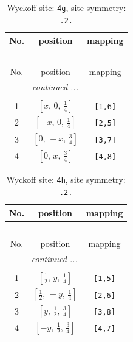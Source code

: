 \documentclass[fleqn,8pt]{jsarticle}
\begin{document}
\begin{longtable}{ccc}
\caption{Wyckoff site: {\tt 4g}, site symmetry: {\tt .2.}}
 \\
 \hline \hline
No. & position & mapping \\ \hline \endfirsthead

\multicolumn{2}{l}{\tablename\ \thetable{}} \\
 \hline \hline
No. & position & mapping \\ \hline \endhead

 \hline \hline
\multicolumn{2}{r}{\footnotesize\it continued ...} \\ \endfoot

 \hline \hline
\multicolumn{2}{r}{} \\ \endlastfoot

1 & $\left[ x,\, 0,\, \frac{1}{4} \right]$ & {\tt [1,6]} \\ \hline
2 & $\left[ - x,\, 0,\, \frac{1}{4} \right]$ & {\tt [2,5]} \\ \hline
3 & $\left[ 0,\, - x,\, \frac{3}{4} \right]$ & {\tt [3,7]} \\ \hline
4 & $\left[ 0,\, x,\, \frac{3}{4} \right]$ & {\tt [4,8]} \\
\end{longtable}
\renewcommand{\arraystretch}{1.2}
\begin{longtable}{ccc}
\caption{Wyckoff site: {\tt 4h}, site symmetry: {\tt .2.}}
 \\
 \hline \hline
No. & position & mapping \\ \hline \endfirsthead

\multicolumn{2}{l}{\tablename\ \thetable{}} \\
 \hline \hline
No. & position & mapping \\ \hline \endhead

 \hline \hline
\multicolumn{2}{r}{\footnotesize\it continued ...} \\ \endfoot

 \hline \hline
\multicolumn{2}{r}{} \\ \endlastfoot

1 & $\left[ \frac{1}{2},\, y,\, \frac{1}{4} \right]$ & {\tt [1,5]} \\ \hline
2 & $\left[ \frac{1}{2},\, - y,\, \frac{1}{4} \right]$ & {\tt [2,6]} \\ \hline
3 & $\left[ y,\, \frac{1}{2},\, \frac{3}{4} \right]$ & {\tt [3,8]} \\ \hline
4 & $\left[ - y,\, \frac{1}{2},\, \frac{3}{4} \right]$ & {\tt [4,7]} \\
\end{longtable}
\end{document}
